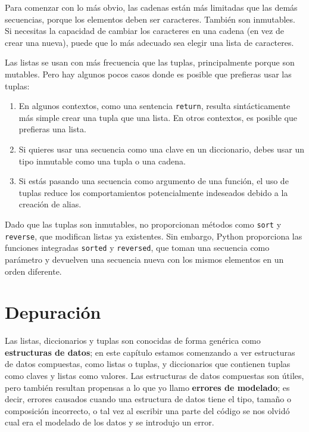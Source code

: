 
Para comenzar con lo más obvio, las cadenas están más limitadas que las demás
secuencias, porque los elementos deben ser caracteres. También son
inmutables. Si necesitas la capacidad de cambiar los caracteres
en una cadena (en vez de crear una nueva), puede que
lo más adecuado sea elegir una lista de caracteres.

Las listas se usan con más frecuencia que las tuplas, principalmente porque son mutables.
Pero hay algunos pocos casos donde es posible que prefieras usar las tuplas:

\begin{enumerate}

\item En algunos contextos, como una sentencia {\tt return}, resulta
sintácticamente más simple crear una tupla que una lista. En otros
contextos, es posible que prefieras una lista.

\item Si quieres usar una secuencia como una clave en un diccionario,
debes usar un tipo inmutable como una tupla o una cadena.

\item Si estás pasando una secuencia como argumento de una función,
el uso de tuplas reduce los comportamientos potencialmente indeseados
debido a la creación de alias.

\end{enumerate}

Dado que las tuplas son inmutables, no proporcionan métodos
como {\tt sort} y {\tt reverse}, que modifican listas ya existentes.
Sin embargo, Python proporciona las funciones integradas {\tt sorted}
y {\tt reversed}, que toman una secuencia como parámetro
y devuelven una secuencia nueva con los mismos elementos en un
orden diferente.



\section{Depuración}


Las listas, diccionarios y tuplas son conocidas de forma genérica como
{\bf estructuras de datos}; en este capítulo estamos comenzando a ver
estructuras de datos compuestas, como listas o tuplas, y diccionarios que contienen tuplas
como claves y listas como valores. Las estructuras de datos compuestas son útiles, pero
también resultan propensas a lo que yo llamo {\bf errores de modelado}; es decir, errores
causados cuando una estructura de datos tiene el tipo, tamaño o composición incorrecto,
o tal vez al escribir una parte del código se nos olvidó cual era el modelado
de los datos y se introdujo un error.

